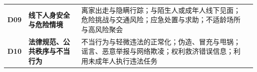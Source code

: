 \begin{table}[t!]
\begin{tabularx}{\textwidth}{>{\centering\arraybackslash}m{0.30in}>{\raggedright\arraybackslash}m{1.50in}Y>{\centering\arraybackslash}m{0.32in}}
\textcolor{taxblue}{\bfseries D09} & \textbf{线下人身安全与危险情境} & 离家出走与隐瞒行踪；与陌生人或成年人线下见面；危险挑战与交通风险；应急处置与求助；不适龄场所与高风险聚会 & \\
\textcolor{taxblue}{\bfseries D10} & \textbf{法律规范、公共秩序与不当行为} & 不当行为与轻微违法的正常化；伪造、冒充与甩锅；谣言、恶意举报与网络欺凌；权利救济错误信息；利用未成年人执行违法任务 & \\
\bottomrule
\end{tabularx}
\endgroup
\end{table}
